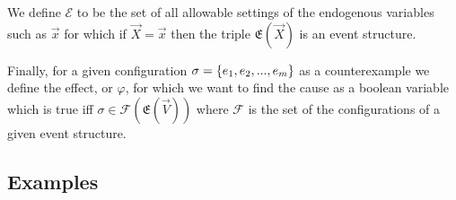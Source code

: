 We define $\mathcal{E}$ to be the set of all allowable
settings of the endogenous variables such as $\vec x$ for which if 
$\vec X = \vec x$ then the triple $\mathfrak{E}(\vec X)$ is an
event structure.

Finally, for a given configuration $\sigma = \{e_1,e_2,...,e_m\}$ as a
counterexample we define the effect, or $\varphi$, for which we want to
find the cause as a boolean variable which is true iff $\sigma \in \mathcal{F}(\mathfrak{E}(\vec V))$ where $\mathcal{F}$ is the set of the configurations of
a given event structure.
\pagebreak
\subsection{Examples}
